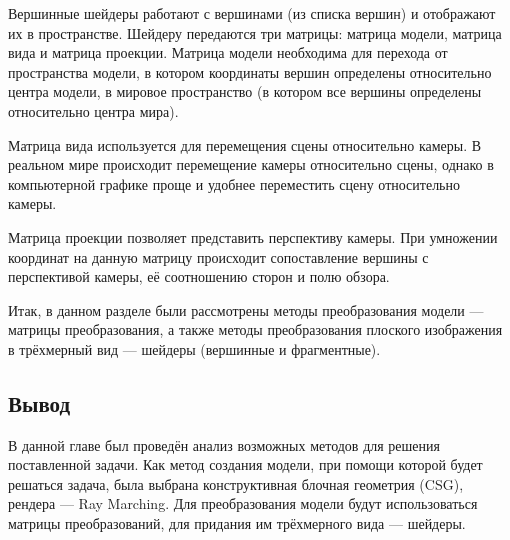Вершинные  шейдеры  работают  с  вершинами  (из  списка  вершин)  и 
отображают  их  в  пространстве.
Шейдеру  передаются  три  матрицы:  матрица модели, матрица вида и матрица проекции.
Матрица  модели  необходима  для  перехода  от  пространства  модели,  в 
котором  координаты  вершин  определены  относительно  центра  модели,  в 
мировое пространство (в котором все вершины определены относительно центра 
мира).

Матрица вида используется для перемещения сцены относительно камеры.
В реальном мире происходит перемещение камеры относительно сцены, однако 
в  компьютерной  графике  проще  и  удобнее  переместить  сцену 
относительно камеры.

Матрица  проекции  позволяет  представить  перспективу  камеры.
При умножении координат на данную матрицу происходит сопоставление вершины с перспективой камеры, её соотношению сторон и полю обзора.




Итак, в данном разделе были рассмотрены методы преобразования модели 
--- матрицы  преобразования,  а  также  методы  преобразования  плоского 
изображения в трёхмерный вид --- шейдеры (вершинные и фрагментные). 

\subsection*{Вывод}
В  данной  главе  был  проведён  анализ  возможных  методов  для  решения 
поставленной задачи.
Как метод создания модели, при помощи которой будет 
решаться  задача,  была  выбрана  конструктивная  блочная геометрия  (CSG), 
рендера  ---  Ray Marching.
Для  преобразования  модели  будут  использоваться 
матрицы преобразований, для придания им трёхмерного вида --- шейдеры.
